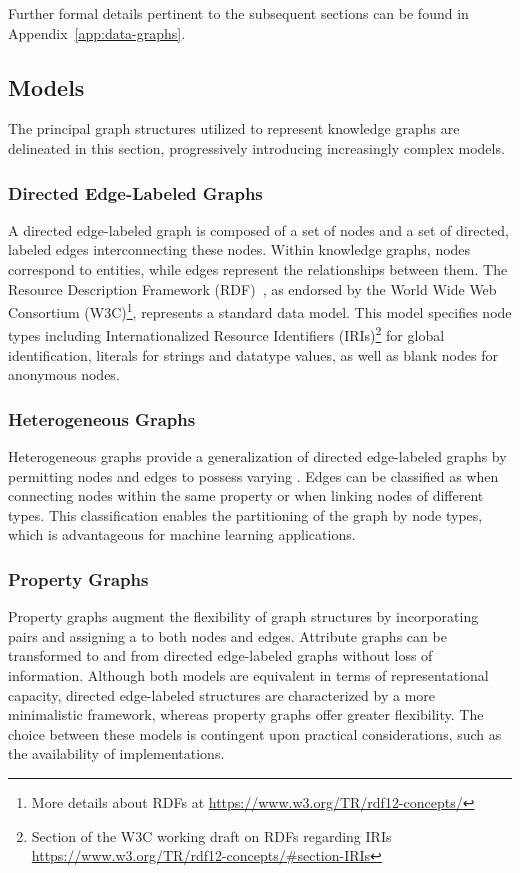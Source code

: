Further formal details pertinent to the subsequent sections can be found in Appendix~\ref{app:data-graphs}.

\subsection{Models}\label{models}
The principal graph structures utilized to represent knowledge graphs are delineated in this section, progressively introducing increasingly complex models.

\subsubsection{Directed Edge-Labeled Graphs}\label{models:directed_edge_labeled_graphs}
A directed edge-labeled graph is composed of a set of nodes and a set of directed, labeled edges interconnecting these nodes. Within knowledge graphs, nodes correspond to entities, while edges represent the relationships between them. The Resource Description Framework (RDF)~\cite{Cyganiak2014rdf}, as endorsed by the World Wide Web Consortium (W3C)\footnote{More details about RDFs at \url{https://www.w3.org/TR/rdf12-concepts/}}, represents a standard data model. This model specifies node types including Internationalized Resource Identifiers (IRIs)\footnote{Section of the W3C working draft on RDFs regarding IRIs \url{https://www.w3.org/TR/rdf12-concepts/\#section-IRIs}} for global identification, literals for strings and datatype values, as well as blank nodes for anonymous nodes.

\subsubsection{Heterogeneous Graphs}
Heterogeneous graphs provide a generalization of directed edge-labeled graphs by permitting nodes and edges to possess varying . Edges can be classified as  when connecting nodes within the same property or  when linking nodes of different types. This classification enables the partitioning of the graph by node types, which is advantageous for machine learning applications.

\subsubsection{Property Graphs}
Property graphs augment the flexibility of graph structures by incorporating  pairs and assigning a  to both nodes and edges. Attribute graphs can be transformed to and from directed edge-labeled graphs without loss of information. Although both models are equivalent in terms of representational capacity, directed edge-labeled structures are characterized by a more minimalistic framework, whereas property graphs offer greater flexibility. The choice between these models is contingent upon practical considerations, such as the availability of implementations.

